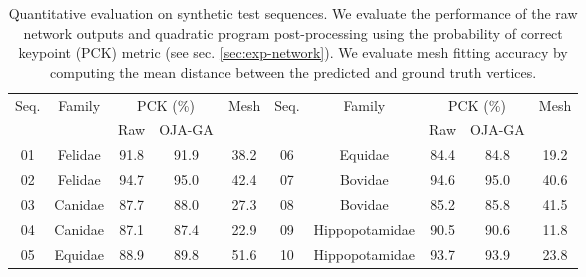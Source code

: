 \begin{table}[ht]
\centering
\small
\begin{tabular}{@{}cccccccccc@{}}

\toprule
        \multirow{2}{*}{Seq.}  & \multirow{2}{*}{Family} & \multicolumn{2}{c}{PCK (\%)} &   \multirow{2}{*}{Mesh}  & \multirow{2}{*}{Seq.} & \multirow{2}{*}{Family} & \multicolumn{2}{c}{PCK (\%)} &   \multirow{2}{*}{Mesh} \\
&  & Raw                  & OJA-GA &  &&& Raw                  & OJA-GA           \\ \midrule
01 & Felidae         & 91.8     & 91.9  & 38.2   &  06 & Equidae         & 84.4     & 84.8  & 19.2     \\
02 & Felidae         & 94.7     & 95.0  & 42.4   &  07 & Bovidae         & 94.6     & 95.0  & 40.6     \\
03 & Canidae         & 87.7     & 88.0  & 27.3   &  08 & Bovidae        & 85.2     & 85.8  & 41.5     \\  
04 & Canidae         & 87.1     & 87.4  & 22.9   &  09 & Hippopotamidae  & 90.5     & 90.6  & 11.8     \\
05 & Equidae         & 88.9     & 89.8  & 51.6   &  10 & Hippopotamidae  & 93.7     & 93.9  & 23.8     \\    
\bottomrule
\end{tabular}%

\caption{Quantitative evaluation on synthetic test sequences. We evaluate the performance of the raw network outputs and quadratic program post-processing using the probability of correct keypoint (PCK) metric (see sec. \ref{sec:exp-network}). We evaluate mesh fitting accuracy by computing the mean distance between the predicted and ground truth vertices.}
\label{tab:synthetic}
\end{table}

